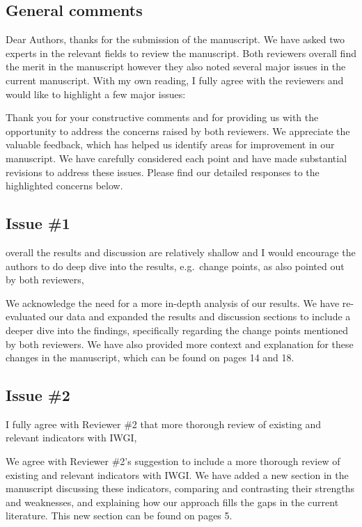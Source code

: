
\subsection{General comments}
\RC{} Dear Authors, thanks for the submission of the manuscript. We have asked two experts in the relevant fields to review the manuscript. Both reviewers overall find the merit in the manuscript however they also noted several major issues in the current manuscript. With my own reading, I fully agree with the reviewers and would like to highlight a few major issues:

\AR{} Thank you for your constructive comments and for providing us with the opportunity to address the concerns raised by both reviewers. We appreciate the valuable feedback, which has helped us identify areas for improvement in our manuscript. We have carefully considered each point and have made substantial revisions to address these issues. Please find our detailed responses to the highlighted concerns below.

\subsection{Issue \#1}
\RC{} overall the results and discussion are relatively shallow and I would encourage the authors to do deep dive into the results, e.g.\ change points, as also pointed out by both reviewers,

\AR{} We acknowledge the need for a more in-depth analysis of our results. We have re-evaluated our data and expanded the results and discussion sections to include a deeper dive into the findings, specifically regarding the change points mentioned by both reviewers. We have also provided more context and explanation for these changes in the manuscript, which can be found on pages 14 and 18.

\subsection{Issue \#2}
\RC{} I fully agree with Reviewer \#2 that more thorough review of existing and relevant indicators with IWGI,

\AR{} We agree with Reviewer \#2's suggestion to include a more thorough review of existing and relevant indicators with IWGI. We have added a new section in the manuscript discussing these indicators, comparing and contrasting their strengths and weaknesses, and explaining how our approach fills the gaps in the current literature. This new section can be found on pages 5.

